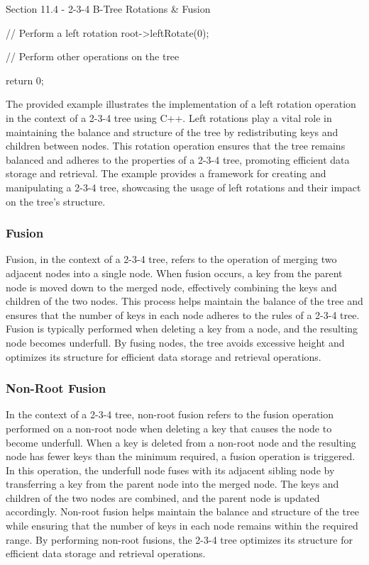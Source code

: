 \begin{notes}{Section 11.4 - 2-3-4 B-Tree Rotations \& Fusion}
\begin{highlight}
\begin{code}[C++]
{        // Perform a left rotation
        root->leftRotate(0);
    
        // Perform other operations on the tree
    
        return 0;
    }        
    \end{code}
        The provided example illustrates the implementation of a left rotation operation in the context of a 2-3-4 tree using C++. Left rotations play a vital role in maintaining the balance and structure of the tree by redistributing keys and children between nodes. This rotation operation ensures that the tree remains balanced and 
        adheres to the properties of a 2-3-4 tree, promoting efficient data storage and retrieval. The example provides a framework for creating and manipulating a 2-3-4 tree, showcasing the usage of left rotations and their impact on the tree's structure.
    \end{highlight}
    
    \subsubsection*{Fusion}
    
    Fusion, in the context of a 2-3-4 tree, refers to the operation of merging two adjacent nodes into a single node. When fusion occurs, a key from the parent node is moved down to the merged node, effectively combining the keys and children of the two nodes. This process helps maintain the balance of the tree and ensures that the 
    number of keys in each node adheres to the rules of a 2-3-4 tree. Fusion is typically performed when deleting a key from a node, and the resulting node becomes underfull. By fusing nodes, the tree avoids excessive height and optimizes its structure for efficient data storage and retrieval operations.
    
    \subsubsection*{Non-Root Fusion}
    
    In the context of a 2-3-4 tree, non-root fusion refers to the fusion operation performed on a non-root node when deleting a key that causes the node to become underfull. When a key is deleted from a non-root node and the resulting node has fewer keys than the minimum required, a fusion operation is triggered. In this operation, 
    the underfull node fuses with its adjacent sibling node by transferring a key from the parent node into the merged node. The keys and children of the two nodes are combined, and the parent node is updated accordingly. Non-root fusion helps maintain the balance and structure of the tree while ensuring that the number of keys in 
    each node remains within the required range. By performing non-root fusions, the 2-3-4 tree optimizes its structure for efficient data storage and retrieval operations.
    

\end{notes}
